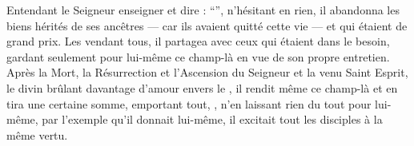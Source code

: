 Entendant le Seigneur enseigner et dire :
\enquote{},
n'hésitant en rien,
il abandonna les biens hérités de ses ancêtres --- car ils avaient quitté cette vie --- et qui étaient  de grand prix. 
Les vendant tous, 
il partagea avec ceux qui étaient dans le besoin, 
gardant seulement pour lui-même ce champ-là en vue de son propre entretien. 
Après la Mort, la Résurrection et l'Ascension du Seigneur et la venu Saint Esprit,
le divin  brûlant davantage d'amour envers le , 
il rendit même ce champ-là et en tira une certaine somme, 
emportant tout,
,
n'en laissant rien du tout pour lui-même,
par l'exemple qu'il donnait lui-même, il excitait tout les  disciples à la même vertu. %


